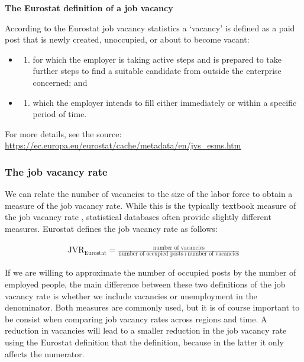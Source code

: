 \documentclass[]{book}
\providecommand{\tightlist}{%
  \setlength{\itemsep}{0pt}\setlength{\parskip}{0pt}}
\newenvironment{myblock}%
{%
 \begin{tcolorbox}%
}%
{\end{tcolorbox}}%
\begin{document}
\begin{myblock}
\textbf{The Eurostat definition of a job vacancy}

According to the Eurostat job vacancy statistics a `vacancy' is defined
as a paid post that is newly created, unoccupied, or about to become
vacant:

\begin{itemize}
\item
  \begin{enumerate}
  \def\labelenumi{(\alph{enumi})}
  \tightlist
  \item
    for which the employer is taking active steps and is prepared to
    take further steps to find a suitable candidate from outside the
    enterprise concerned; and
  \end{enumerate}
\item
  \begin{enumerate}
  \def\labelenumi{(\alph{enumi})}
  \setcounter{enumi}{1}
  \tightlist
  \item
    which the employer intends to fill either immediately or within a
    specific period of time.
  \end{enumerate}
\end{itemize}

For more details, see the source:
\url{https://ec.europa.eu/eurostat/cache/metadata/en/jvs_esms.htm}
\end{myblock}

\hypertarget{the-job-vacancy-rate}{%
\subsubsection{The job vacancy rate}\label{the-job-vacancy-rate}}

We can relate the number of vacancies to the size of the labor force to obtain a measure of the job vacancy rate. While this is the typically textbook measure of the job vacancy rate \citep[p.~512 in][]{zyb}, statistical databases often provide slightly different measures. Eurostat defines the job vacancy rate as follows:

\begin{align}
  \text{JVR}_{\text{Eurostat}}=\frac{\text{number of vacancies}}{\text{number of occupied posts}+\text{number of vacancies}}
\end{align}

If we are willing to approximate the number of occupied posts by the number of employed people, the main difference between these two definitions of the job vacancy rate is whether we include vacancies or unemployment in the denominator. Both measures are commonly used, but it is of course important to be consist when comparing job vacancy rates across regions and time. A reduction in vacancies will lead to a smaller reduction in the job vacancy rate using the Eurostat definition that the \citep{zyb} definition, because in the latter it only affects the numerator.
\end{document}
